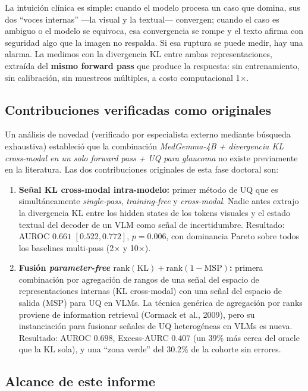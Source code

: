\documentclass[12pt,a4paper]{article}
\begin{document}
La intuición clínica es simple: cuando el modelo procesa un caso que
domina, sus dos ``voces internas'' ---la visual y la textual--- convergen;
cuando el caso es ambiguo o el modelo se equivoca, esa convergencia se
rompe y el texto afirma con seguridad algo que la imagen no respalda. Si
esa ruptura se puede medir, hay una alarma. La medimos con la divergencia
KL entre ambas representaciones, extraída del \textbf{mismo forward pass}
que produce la respuesta: sin entrenamiento, sin calibración, sin muestreos
múltiples, a costo computacional 1$\times$.

\subsection{Contribuciones verificadas como originales}

Un análisis de novedad (verificado por especialista externo mediante
búsqueda exhaustiva) estableció que la combinación
\emph{MedGemma-4B + divergencia KL cross-modal en un solo forward pass +
UQ para glaucoma} no existe previamente en la literatura. Las dos
contribuciones originales de esta fase doctoral son:

\begin{enumerate}[leftmargin=1.6em]
    \item \textbf{Señal KL cross-modal intra-modelo:} primer método de UQ
    que es simultáneamente \emph{single-pass}, \emph{training-free} y
    \emph{cross-modal}. Nadie antes extrajo la divergencia KL entre los
    hidden states de los tokens visuales y el estado textual del decoder
    de un VLM como señal de incertidumbre. Resultado: AUROC $0.661$
    $[0.522, 0.772]$, $p = 0.006$, con dominancia Pareto sobre todos los
    baselines multi-pass (2$\times$ y 10$\times$).
    \item \textbf{Fusión \emph{parameter-free}
    $\mathrm{rank}(\mathrm{KL}) + \mathrm{rank}(1-\mathrm{MSP})$:} primera
    combinación por agregación de rangos de una señal del espacio de
    representaciones internas (KL cross-modal) con una señal del espacio
    de salida (MSP) para UQ en VLMs. La técnica genérica de agregación por
    ranks proviene de information retrieval (Cormack et al., 2009), pero
    su instanciación para fusionar señales de UQ heterogéneas en VLMs es
    nueva. Resultado: AUROC $0.698$, Excess-AURC $0.407$ (un 39\% más
    cerca del oracle que la KL sola), y una ``zona verde'' del 30.2\% de
    la cohorte sin errores.
\end{enumerate}

\subsection{Alcance de este informe}
\end{document}
